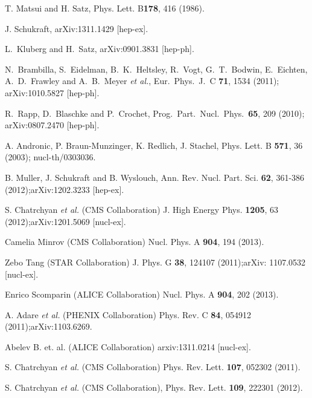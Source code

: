 \documentclass[aps,prc,preprint,superscriptaddress,showpacs,showkeys]{revtex4-1}
\begin{document}
\noindent
\begin{thebibliography}{100}
\medskip

 T. Matsui and H. Satz, Phys. Lett. B{\bf 178}, 416 (1986).
	
 J. Schukraft, arXiv:1311.1429 [hep-ex].

  L.~Kluberg and H.~Satz, arXiv:0901.3831 [hep-ph].

  N.~Brambilla, S.~Eidelman, B.~K.~Heltsley, R.~Vogt, G.~T.~Bodwin, 
  E.~Eichten, A.~D.~Frawley and A.~B.~Meyer {\it et al.},  Eur.\ Phys.\ J.\ C {\bf 71}, 1534 (2011); arXiv:1010.5827 [hep-ph].

  R.~Rapp, D.~Blaschke and P.~Crochet, Prog.\ Part.\ Nucl.\ Phys.\ {\bf 65}, 209 (2010); arXiv:0807.2470 [hep-ph].

 A. Andronic, P. Braun-Munzinger, K. Redlich, J. Stachel, Phys. Lett. B {\bf 571}, 36 (2003); nucl-th/0303036.

 
 B. Muller, J. Schukraft and B. Wyslouch, Ann. Rev. Nucl. Part. Sci. {\bf 62}, 361-386 (2012);arXiv:1202.3233 [hep-ex].

 S. Chatrchyan {\it et al.} (CMS Collaboration) J. High Energy Phys. {\bf 1205}, 63 (2012);arXiv:1201.5069 [nucl-ex].

 Camelia Minrov (CMS Collaboration) Nucl. Phys. A {\bf 904}, 194 (2013).

 Zebo Tang (STAR Collaboration) J. Phys. G {\bf 38}, 124107 (2011);arXiv: 1107.0532 [nucl-ex].

 Enrico Scomparin (ALICE Collaboration) Nucl. Phys. A {\bf 904}, 202 (2013).

 A. Adare {\it et al.} (PHENIX Collaboration) Phys. Rev. C {\bf 84}, 054912 (2011);arXiv:1103.6269.

 Abelev B. {et. al.} (ALICE Collaboration) arxiv:1311.0214 [nucl-ex].

 S. Chatrchyan {\it et al.} (CMS Collaboration) Phys. Rev. Lett. {\bf 107}, 052302 (2011).

 S. Chatrchyan {\it et al.} (CMS Collaboration), Phys. Rev. Lett. {\bf 109}, 222301 (2012). 


\end{thebibliography}
\end{document}
